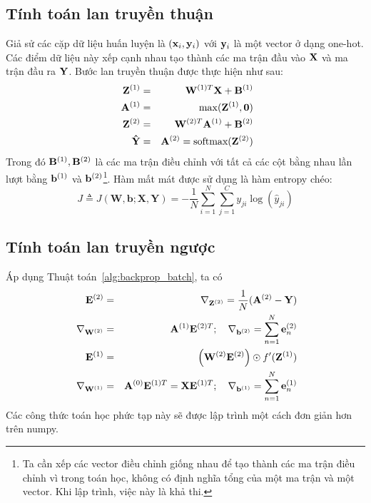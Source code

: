 \subsection{Tính toán lan truyền thuận}
Giả sử các cặp dữ liệu huấn luyện là $(\mathbf{x}_i, \mathbf{y}_i)$ với $\mathbf{y}_i$ là một vector
ở dạng one-hot. Các điểm dữ liệu này xếp cạnh nhau tạo thành các ma trận đầu
vào $\mathbf{X}$ và ma trận đầu ra $\mathbf{Y}$. Bước lan truyền thuận được
thực hiện như sau:
\begin{eqnarray}
\mathbf{Z}^{(1)} &=& \mathbf{W}^{(1)T}\mathbf{X} + \mathbf{B}^{(1)}\\\
\mathbf{A}^{(1)} &=& \max(\mathbf{Z}^{(1)}, \mathbf{0}) \\\
\mathbf{Z}^{(2)} &=& \mathbf{W}^{(2)T}\mathbf{A}^{(1)} + \mathbf{B}^{(2)}\\\
\mathbf{\hat{Y}} &=& \mathbf{A}^{(2)} = \text{softmax}(\mathbf{Z}^{(2)})
\end{eqnarray}
Trong đó $\mathbf{B}^{(1)}, \mathbf{B}^{(2)}$ là các ma trận điều chỉnh với tất cả các cột bằng nhau
lần lượt bằng $\mathbf{b}^{(1)}$ và $\mathbf{b}^{(2)}$\footnote{Ta cần xếp các vector điều chỉnh
giống nhau để tạo thành các ma trận điều chỉnh vì trong toán học, không có định nghĩa
tổng của một ma trận và một vector. Khi lập trình, việc này là khả thi.}.
Hàm mất mát được sử dụng là hàm entropy chéo:
\begin{equation}
J \triangleq J(\mathbf{W, b}; \mathbf{X, Y}) = -\frac{1}{N}\sum_{i = 1}^N \sum_{j = 1}^C y_{ji}\log(\hat{y}_{ji})
\end{equation}


\subsection{Tính toán lan truyền ngược}
Áp dụng Thuật toán~\ref{alg:backprop_batch}, ta có
\begin{eqnarray}
\mathbf{E}^{(2)} &=& \nabla_{\mathbf{Z}^{(2)}}
=\frac{1}{N}(\mathbf{A}^{(2)}- \mathbf{Y}) \\\
\nabla_{\mathbf{W}^{(2)}} &=& \mathbf{A}^{(1)}
\mathbf{E}^{(2)T}; \quad
\nabla_{\mathbf{b}^{(2)}} = \sum_{n=1}^N\mathbf{e}_n^{(2)}
\\\
\mathbf{E}^{(1)} &=& \left(\mathbf{W}^{(2)}\mathbf{E}^{(2)}\right) \odot
f'(\mathbf{Z}^{(1)}) \\\
\nabla_{\mathbf{W}^{(1)}} &=& \mathbf{A}^{(0)}
\mathbf{E}^{(1)T} = \mathbf{X}\mathbf{E}^{(1)T};\quad
\nabla_{\mathbf{b}^{(1)}} = \sum_{n=1}^N\mathbf{e}_n^{(1)}
\end{eqnarray}
Các công thức toán học phức tạp này sẽ được lập trình một cách đơn giản
hơn trên numpy.

